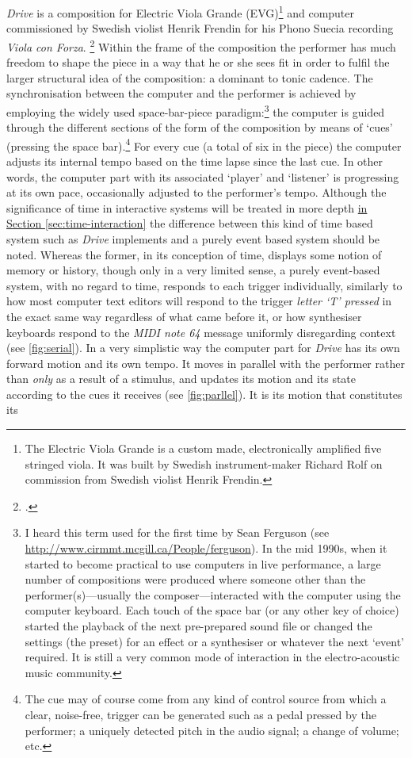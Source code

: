 
\emph{Drive} is a composition for Electric Viola Grande (EVG)\footnote{The Electric Viola Grande is a custom made, electronically amplified five stringed viola. It was built by Swedish instrument-maker Richard Rolf on commission from Swedish violist Henrik Frendin.}  and computer commissioned by Swedish violist Henrik Frendin for his Phono Suecia recording \emph{Viola con Forza}. \footcite{frendin04} Within the frame of the composition the performer has much freedom to shape the piece in a way that he or she sees fit in order to fulfil the larger structural idea of the composition: a dominant to tonic cadence. The synchronisation between the computer and the performer is achieved by employing the widely used space-bar-piece paradigm:\footnote{I heard this term used for the first time by Sean Ferguson (see \url{http://www.cirmmt.mcgill.ca/People/ferguson}). In the mid 1990s, when it started to become practical to use computers in live performance, a large number of compositions were produced where someone other than the performer(s)---usually the composer---interacted with the computer using the computer keyboard. Each touch of the space bar (or any other key of choice) started the playback of the next pre-prepared sound file or changed the settings (the preset) for an effect or a synthesiser or whatever the next `event' required. It is still a very common mode of interaction in the electro-acoustic music community.} the computer is guided through the different sections of the form of the composition by means of `cues' (pressing the space bar).\footnote{The cue may of course come from any kind of control source from which a clear, noise-free, trigger can be generated such as a pedal pressed by the performer; a uniquely detected pitch in the audio signal; a change of volume; etc.} For every cue (a total of six in the piece) the computer adjusts its internal tempo based on the time lapse since the last cue. In other words, the computer part with its associated `player' and `listener' is progressing at its own pace, occasionally adjusted to the performer's tempo. Although the significance of time in interactive systems will be treated in more depth \hyperref[sec:time-interaction]{in Section \ref*{sec:time-interaction}} the difference between this kind of time based system such as \emph{Drive} implements and a purely event based system should be noted. Whereas the former, in its conception of time, displays some notion of memory or history, though only in a very limited sense, a purely event-based system, with no regard to time, responds to each trigger individually, similarly to how most computer text editors will respond to the trigger \emph{letter `T' pressed} in the exact same way regardless of what came before it, or how synthesiser keyboards respond to the \emph{MIDI note 64} message uniformly disregarding context (see \autoref{fig:serial}). In a very simplistic way the computer part for \emph{Drive} has its own forward motion and its own tempo. It moves in parallel with the performer rather than \emph{only} as a result of a stimulus, and updates its motion and its state according to the cues it receives (see \autoref{fig:parllel}). It is its motion that constitutes its 